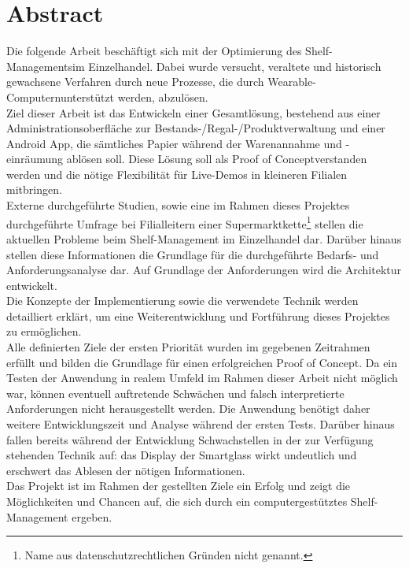 \chapter*{Abstract} %

Die folgende Arbeit beschäftigt sich mit der Optimierung des \glqq Shelf-Managements\grqq im Einzelhandel. Dabei wurde versucht, veraltete und historisch gewachsene Verfahren durch neue Prozesse, die durch \glqq Wearable-Computern\grqq unterstützt werden, abzulösen.\\

Ziel dieser Arbeit ist das Entwickeln einer Gesamtlösung, bestehend aus einer Administrationsoberfläche zur Bestands-/Regal-/Produktverwaltung und einer Android App, die sämtliches Papier während der Warenannahme und -einräumung ablösen soll. Diese Lösung soll als \glqq Proof of Concept\grqq verstanden werden und die nötige Flexibilität für Live-Demos in kleineren Filialen mitbringen.\\

Externe durchgeführte Studien, sowie eine im Rahmen dieses Projektes durchgeführte Umfrage bei Filialleitern einer Supermarktkette\footnote{Name aus datenschutzrechtlichen Gründen nicht genannt.} stellen die aktuellen Probleme beim Shelf-Management im Einzelhandel dar. Darüber hinaus stellen diese Informationen die Grundlage für die durchgeführte Bedarfs- und Anforderungsanalyse dar. Auf Grundlage der Anforderungen wird die Architektur entwickelt.\\

Die Konzepte der Implementierung sowie die verwendete Technik werden detailliert erklärt, um eine Weiterentwicklung und Fortführung dieses Projektes zu ermöglichen.\\

Alle definierten Ziele der ersten Priorität wurden im gegebenen Zeitrahmen erfüllt und bilden die Grundlage für einen erfolgreichen \glqq Proof of Concept\grqq . Da ein Testen der Anwendung in realem Umfeld im Rahmen dieser Arbeit nicht möglich war, können eventuell auftretende Schwächen und falsch interpretierte Anforderungen nicht herausgestellt werden. Die Anwendung benötigt daher weitere Entwicklungszeit und Analyse während der ersten Tests. Darüber hinaus fallen bereits während der Entwicklung Schwachstellen in der zur Verfügung stehenden Technik auf: das Display der Smartglass wirkt undeutlich und erschwert das Ablesen der nötigen Informationen.\\

Das Projekt ist im Rahmen der gestellten Ziele ein Erfolg und zeigt die Möglichkeiten und Chancen auf, die sich durch ein computergestütztes Shelf-Management ergeben.